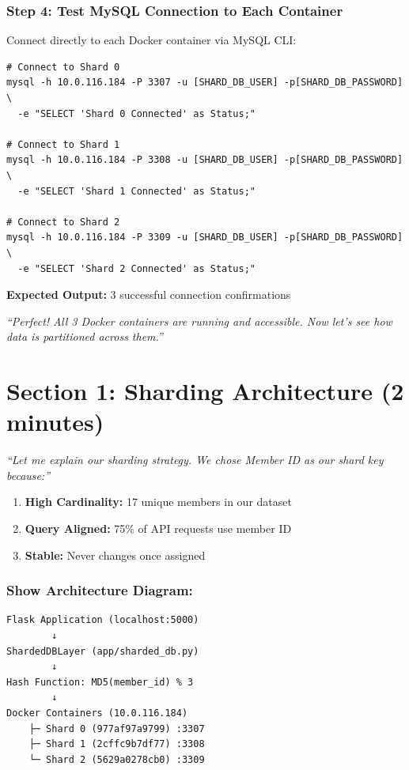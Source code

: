 \documentclass[12pt]{article}
\begin{document}
\subsubsection*{Step 4: Test MySQL Connection to Each Container}

Connect directly to each Docker container via MySQL CLI:

\begin{lstlisting}
# Connect to Shard 0
mysql -h 10.0.116.184 -P 3307 -u [SHARD_DB_USER] -p[SHARD_DB_PASSWORD] \
  -e "SELECT 'Shard 0 Connected' as Status;"

# Connect to Shard 1
mysql -h 10.0.116.184 -P 3308 -u [SHARD_DB_USER] -p[SHARD_DB_PASSWORD] \
  -e "SELECT 'Shard 1 Connected' as Status;"

# Connect to Shard 2
mysql -h 10.0.116.184 -P 3309 -u [SHARD_DB_USER] -p[SHARD_DB_PASSWORD] \
  -e "SELECT 'Shard 2 Connected' as Status;"
\end{lstlisting}

\textbf{Expected Output:} 3 successful connection confirmations

\textit{``Perfect! All 3 Docker containers are running and accessible. Now let's see how data is partitioned across them.''}

\section{Section 1: Sharding Architecture (2 minutes)}

\textit{``Let me explain our sharding strategy. We chose Member ID as our shard key because:''}

\begin{enumerate}
    \item \textbf{High Cardinality:} 17 unique members in our dataset
    \item \textbf{Query Aligned:} 75\% of API requests use member ID
    \item \textbf{Stable:} Never changes once assigned
\end{enumerate}

\subsubsection*{Show Architecture Diagram:}

\begin{lstlisting}
Flask Application (localhost:5000)
        ↓
ShardedDBLayer (app/sharded_db.py)
        ↓
Hash Function: MD5(member_id) % 3
        ↓
Docker Containers (10.0.116.184)
    ├─ Shard 0 (977af97a9799) :3307
    ├─ Shard 1 (2cffc9b7df77) :3308
    └─ Shard 2 (5629a0278cb0) :3309
\end{lstlisting}
\end{document}
